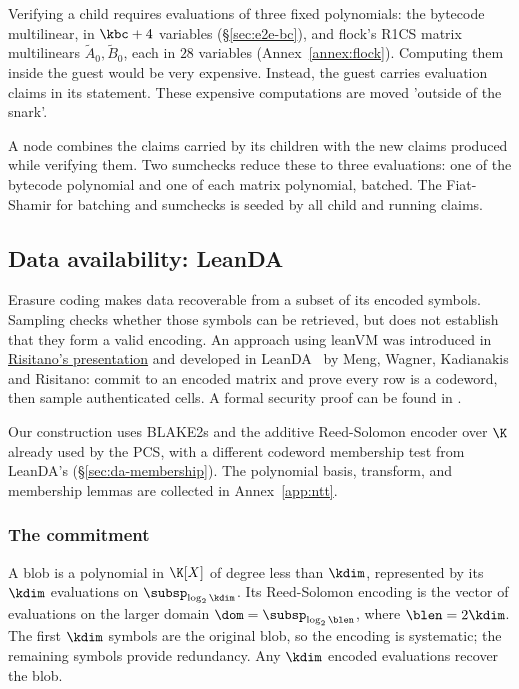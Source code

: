 Verifying a child requires evaluations of three fixed polynomials: the bytecode multilinear, in $\kbc+4$ variables (\S\ref{sec:e2e-bc}), and flock's R1CS matrix multilinears $\widetilde A_0,\widetilde B_0$, each in $28$ variables (Annex~\ref{annex:flock}). Computing them inside the guest would be very expensive. Instead, the guest carries evaluation claims in its statement. These expensive computations are moved 'outside of the snark'.

A node combines the claims carried by its children with the new claims produced while verifying them. Two sumchecks reduce these to three evaluations: one of the bytecode polynomial and one of each matrix polynomial, batched. The Fiat-Shamir for batching and sumchecks is seeded by all child and running claims.

\subsection{Data availability: LeanDA}\label{sec:leanda}

Erasure coding makes data recoverable from a subset of its encoded symbols. Sampling checks whether those symbols can be retrieved, but does not establish that they form a valid encoding. An approach using leanVM was introduced in \href{https://frisitano.github.io/slides/presentations/leanvm-fold-in-circuit-das-2026-05-08/index.html}{Risitano's presentation} and developed in LeanDA~\cite{LeanDA} by Meng, Wagner, Kadianakis and Risitano: commit to an encoded matrix and prove every row is a codeword, then sample authenticated cells. A formal security proof can be found in \cite{LeanDASecurity}.

Our construction uses BLAKE2s and the additive Reed-Solomon encoder over $\K$ already used by the PCS, with a different codeword membership test from LeanDA's (\S\ref{sec:da-membership}). The polynomial basis, transform, and membership lemmas are collected in Annex~\ref{app:ntt}.


\subsubsection{The commitment}\label{sec:da-commit}

A blob is a polynomial in $\K[X]$ of degree less than $\kdim$, represented by its $\kdim$ evaluations on $\subsp_{\log_2\kdim}$. Its Reed-Solomon encoding is the vector of evaluations on the larger domain $\dom=\subsp_{\log_2\blen}$, where $\blen=2\kdim$. The first $\kdim$ symbols are the original blob, so the encoding is systematic; the remaining symbols provide redundancy. Any $\kdim$ encoded evaluations recover the blob.

